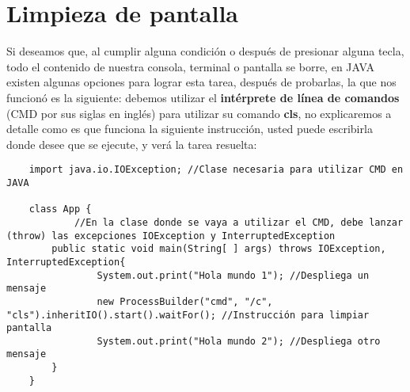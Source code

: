 \section{Limpieza de pantalla}
Si deseamos que, al cumplir alguna condición o después de presionar alguna tecla, todo el contenido de nuestra consola, terminal o pantalla se borre, en JAVA existen algunas opciones para lograr esta tarea, después de probarlas, la que nos funcionó es la siguiente: debemos utilizar el \textbf{intérprete de línea de comandos} (CMD por sus siglas en inglés) para utilizar su comando \textbf{cls}, no explicaremos a detalle como es que funciona la siguiente instrucción, usted puede escribirla donde desee que se ejecute, y verá la tarea resuelta:
\begin{lstlisting}
	import java.io.IOException; //Clase necesaria para utilizar CMD en JAVA

    class App {
    		//En la clase donde se vaya a utilizar el CMD, debe lanzar (throw) las excepciones IOException y InterruptedException
        public static void main(String[ ] args) throws IOException, InterruptedException{
        		System.out.print("Hola mundo 1"); //Despliega un mensaje
        		new ProcessBuilder("cmd", "/c", "cls").inheritIO().start().waitFor(); //Instrucción para limpiar pantalla
        		System.out.print("Hola mundo 2"); //Despliega otro mensaje
        }
    }
\end{lstlisting}